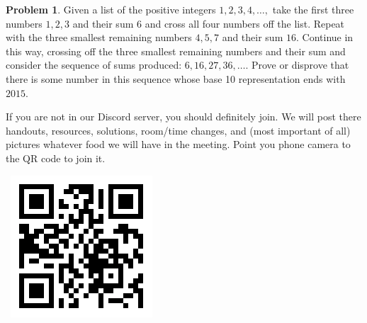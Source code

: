 \documentclass{scrartcl}
\theoremstyle{definition}
\newtheorem{prob}{Problem}
\begin{document}
	\begin{prob}%
		Given a list of the positive integers $1,2,3,4,\dots,$ take the first three numbers $1,2,3$ and their sum $6$ and cross all four numbers off the list. Repeat with the three smallest remaining numbers $4,5,7$ and their sum $16.$ Continue in this way, crossing off the three smallest remaining numbers and their sum and consider the sequence of sums produced: $6,16,27, 36, \dots.$ Prove or disprove that there is some number in this sequence whose base 10 representation ends with $2015.$
	\end{prob}


	\vfill

	\begin{minipage}{.85\textwidth}{}
		\footnotesize
		If you are not in our Discord server, you should definitely join.
		We will post there handouts, resources, solutions, room/time changes, and (most important of all) pictures whatever food we will have in the meeting. Point you phone camera to the QR code to join it.
	\end{minipage}
	\begin{minipage}{.15\textwidth}{}
		\ \hfill \includegraphics[height = .8in]{qr}
	\end{minipage}
\end{document}
